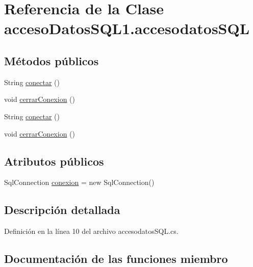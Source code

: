 \hypertarget{classacceso_datos_s_q_l1_1_1accesodatos_s_q_l}{}\section{Referencia de la Clase acceso\+Datos\+S\+Q\+L1.\+accesodatos\+S\+QL}
\label{classacceso_datos_s_q_l1_1_1accesodatos_s_q_l}
\subsection*{Métodos públicos}
\begin{DoxyCompactItemize}
\item 
String \mbox{\hyperlink{classacceso_datos_s_q_l1_1_1accesodatos_s_q_l_ae76180c27e16450efd4d6121534f1acb}{conectar}} ()
\item 
void \mbox{\hyperlink{classacceso_datos_s_q_l1_1_1accesodatos_s_q_l_ad3ba7760f992cfc9277b05093b661115}{cerrar\+Conexion}} ()
\item 
String \mbox{\hyperlink{classacceso_datos_s_q_l1_1_1accesodatos_s_q_l_ae76180c27e16450efd4d6121534f1acb}{conectar}} ()
\item 
void \mbox{\hyperlink{classacceso_datos_s_q_l1_1_1accesodatos_s_q_l_ad3ba7760f992cfc9277b05093b661115}{cerrar\+Conexion}} ()
\end{DoxyCompactItemize}
\subsection*{Atributos públicos}
\begin{DoxyCompactItemize}
\item 
Sql\+Connection \mbox{\hyperlink{classacceso_datos_s_q_l1_1_1accesodatos_s_q_l_a1932eb53bebc0d2002cc3c40e21f9385}{conexion}} = new Sql\+Connection()
\end{DoxyCompactItemize}


\subsection{Descripción detallada}


Definición en la línea 10 del archivo accesodatos\+S\+Q\+L.\+cs.



\subsection{Documentación de las funciones miembro}
\mbox{\label{classacceso_datos_s_q_l1_1_1accesodatos_s_q_l_ad3ba7760f992cfc9277b05093b661115}} 
